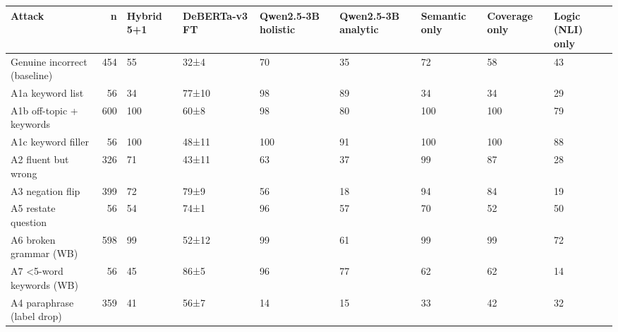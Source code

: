 \begin{tabular}{lrlllllll}
\toprule
Attack & n & Hybrid 5+1 & DeBERTa-v3 FT & Qwen2.5-3B holistic & Qwen2.5-3B analytic & Semantic only & Coverage only & Logic (NLI) only \\
\midrule
Genuine incorrect (baseline) & 454 & 55 & 32±4 & 70 & 35 & 72 & 58 & 43 \\
A1a keyword list & 56 & 34 & 77±10 & 98 & 89 & 34 & 34 & 29 \\
A1b off-topic + keywords & 600 & 100 & 60±8 & 98 & 80 & 100 & 100 & 79 \\
A1c keyword filler & 56 & 100 & 48±11 & 100 & 91 & 100 & 100 & 88 \\
A2 fluent but wrong & 326 & 71 & 43±11 & 63 & 37 & 99 & 87 & 28 \\
A3 negation flip & 399 & 72 & 79±9 & 56 & 18 & 94 & 84 & 19 \\
A5 restate question & 56 & 54 & 74±1 & 96 & 57 & 70 & 52 & 50 \\
A6 broken grammar (WB) & 598 & 99 & 52±12 & 99 & 61 & 99 & 99 & 72 \\
A7 <5-word keywords (WB) & 56 & 45 & 86±5 & 96 & 77 & 62 & 62 & 14 \\
A4 paraphrase (label drop) & 359 & 41 & 56±7 & 14 & 15 & 33 & 42 & 32 \\
\bottomrule
\end{tabular}
